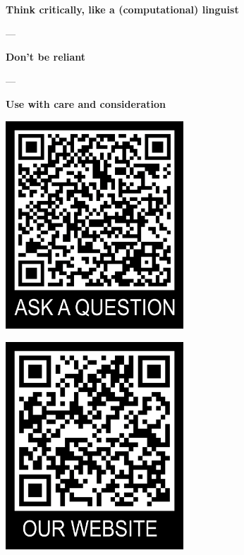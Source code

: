 \documentclass[aspectratio=169,hyperref={unicode}]{beamer}
\begin{document}
\begin{frame}
\begin{center}

\textbf{Think critically, like a (computational) linguist}

---

\textbf{Don't be reliant}

---

\textbf{Use with care and consideration}


\vspace{1em}

\begin{minipage}{0.4\textwidth}
\centering
    \includegraphics[width=0.5\textwidth]{QRtemplate_5.png}
  \end{minipage}
  \hfill
  \begin{minipage}{0.4\textwidth}
  \centering
    \includegraphics[width=0.5\textwidth]{QRtemplate_4.png}
  \end{minipage}
\end{center}
\end{frame}
\end{document}
